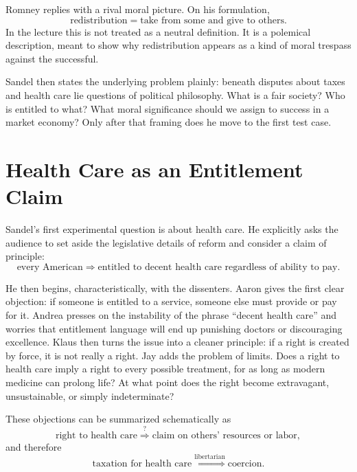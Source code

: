 Romney replies with a rival moral picture. On his formulation,
\begin{equation}
\text{redistribution}
=
\text{take from some and give to others}.
\end{equation}
In the lecture this is not treated as a neutral definition. It is a polemical description, meant to show why redistribution appears as a kind of moral trespass against the successful.

Sandel then states the underlying problem plainly: beneath disputes about taxes and health care lie questions of political philosophy. What is a fair society? Who is entitled to what? What moral significance should we assign to success in a market economy? Only after that framing does he move to the first test case.

\section{Health Care as an Entitlement Claim}

Sandel's first experimental question is about health care. He explicitly asks the audience to set aside the legislative details of reform and consider a claim of principle:
\begin{equation}
\text{every American}
\Longrightarrow
\text{entitled to decent health care regardless of ability to pay}.
\end{equation}

He then begins, characteristically, with the dissenters. Aaron gives the first clear objection: if someone is entitled to a service, someone else must provide or pay for it. Andrea presses on the instability of the phrase ``decent health care'' and worries that entitlement language will end up punishing doctors or discouraging excellence. Klaus then turns the issue into a cleaner principle: if a right is created by force, it is not really a right. Jay adds the problem of limits. Does a right to health care imply a right to every possible treatment, for as long as modern medicine can prolong life? At what point does the right become extravagant, unsustainable, or simply indeterminate?

These objections can be summarized schematically as
\begin{equation}
\text{right to health care}
\stackrel{?}{\Longrightarrow}
\text{claim on others' resources or labor},
\end{equation}
and therefore
\begin{equation}
\text{taxation for health care}
\stackrel{\text{libertarian}}{\Longrightarrow}
\text{coercion}.
\end{equation}

